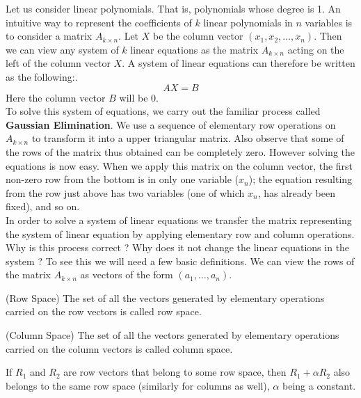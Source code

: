 Let us consider linear polynomials. That is, polynomials whose degree is 1. An intuitive way to represent the coefficients of $k$ linear polynomials in $n$ variables is to consider a matrix $A_{k \times n}$. Let $X$ be the column vector $(x_1, x_2, \ldots, x_n)$. Then we can view any 
system of $k$ linear equations as the matrix $A_{k \times n}$ acting on the left of the column vector $X$. A system of linear equations can therefore be written as the following:.\\
\[ AX = B \]
Here the column vector $B$ will be 0.\\
To solve this system of equations, we carry out the familiar process called \textbf{Gaussian Elimination}. We use a sequence of elementary row operations on $A_{k \times n}$ to transform it into a upper triangular matrix. Also observe that some of the rows of the matrix thus obtained can be completely zero. However solving the equations is now easy. When we apply this matrix on the column vector, the first non-zero row from the bottom is in only one variable ($x_n$); the equation resulting from the row just above has two variables (one of which $x_n$, has already been fixed), and so on.\\

In order to solve a system of linear equations we transfer the matrix representing the system of linear equation by applying elementary row and column operations. Why is this process correct ? Why does it not change the linear equations in the system ? To see this we will need a few basic definitions. We can view the rows of the matrix  $A_{k \times n}$ as vectors of the form $(a_1,\ldots,a_n)$. 

\begin{definition} (Row Space)
The set of all the vectors generated by elementary operations carried on the row vectors is called row space.
\end{definition}

\begin{definition} (Column Space)
The set of all the vectors generated by elementary operations carried on the column vectors is called column space.
\end{definition}

\begin{example}\label{row_space_example}
If $R_1$ and $R_2$ are row vectors that belong to some row space, then $R_1 + \alpha R_2$ also belongs to the same row space (similarly for columns as well), $\alpha$ being a constant.
\end{example}

